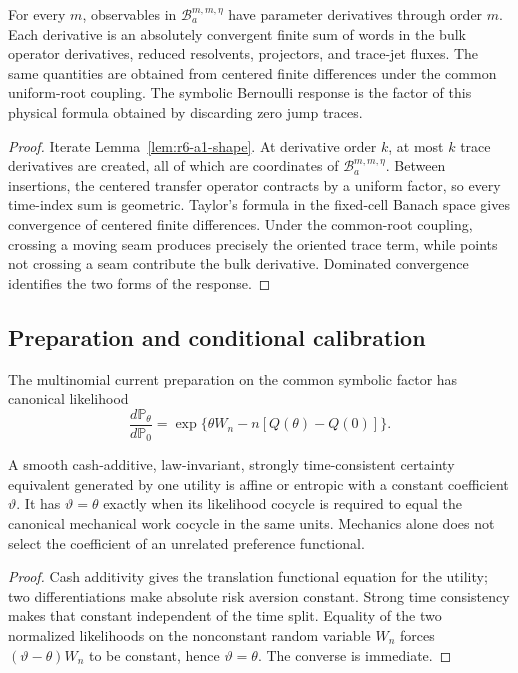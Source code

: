 \begin{theorem}
\label{thm:r6-a1-response}
For every \(m\), observables in
\(\mathscr B_a^{m,m,\eta}\) have parameter derivatives through order \(m\).
Each derivative is an absolutely convergent finite sum of words in the bulk
operator derivatives, reduced resolvents, projectors, and trace-jet fluxes.
The same quantities are obtained from centered finite differences under the
common uniform-root coupling.  The symbolic Bernoulli response is the factor
of this physical formula obtained by discarding zero jump traces.
\end{theorem}

\begin{proof}
Iterate Lemma~\ref{lem:r6-a1-shape}.  At derivative order \(k\), at most
\(k\) trace derivatives are created, all of which are coordinates of
\(\mathscr B_a^{m,m,\eta}\).  Between insertions, the centered transfer
operator contracts by a uniform factor, so every time-index sum is geometric.
Taylor's formula in the fixed-cell Banach space gives convergence of centered
finite differences.  Under the common-root coupling, crossing a moving seam
produces precisely the oriented trace term, while points not crossing a seam
contribute the bulk derivative.  Dominated convergence identifies the two
forms of the response.
\end{proof}

\subsection{Preparation and conditional calibration}

The multinomial current preparation on the common symbolic factor has
canonical likelihood
\[
\frac{d\mathbb P_\theta}{d\mathbb P_0}
=\exp\{\theta W_n-n[Q(\theta)-Q(0)]\}.
\]

\begin{theorem}
\label{thm:r6-a1-calibration}
A smooth cash-additive, law-invariant, strongly time-consistent certainty
equivalent generated by one utility is affine or entropic with a constant
coefficient \(\vartheta\).  It has \(\vartheta=\theta\) exactly when its
likelihood cocycle is required to equal the canonical mechanical work cocycle
in the same units.  Mechanics alone does not select the coefficient of an
unrelated preference functional.
\end{theorem}

\begin{proof}
Cash additivity gives the translation functional equation for the utility;
two differentiations make absolute risk aversion constant.  Strong time
consistency makes that constant independent of the time split.  Equality of
the two normalized likelihoods on the nonconstant random variable \(W_n\)
forces \((\vartheta-\theta)W_n\) to be constant, hence
\(\vartheta=\theta\).  The converse is immediate.
\end{proof}

